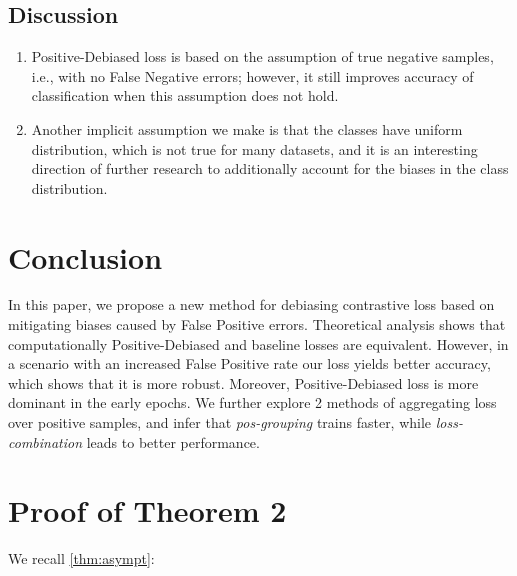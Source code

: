 \documentclass{article}
\begin{document}
\subsection{Discussion}
\begin{enumerate}
    \item Positive-Debiased loss is based on the assumption of true negative samples, i.e., with no False Negative errors; however, it still improves accuracy of classification when this assumption does not hold.
    \item Another implicit assumption we make is that the classes have uniform distribution, which is not true for many datasets, and it is an interesting direction of further research to additionally account for the biases in the class distribution.
\end{enumerate}

\section{Conclusion}
In this paper, we propose a new method for debiasing contrastive loss based on mitigating biases caused by False Positive errors. Theoretical analysis shows that computationally Positive-Debiased and baseline losses are equivalent. However, in a scenario with an increased False Positive rate our loss yields better accuracy, which shows that it is more robust. Moreover, Positive-Debiased loss is more dominant in the early epochs. We further explore 2 methods of aggregating loss over positive samples, and infer that \textit{pos-grouping} trains faster, while \textit{loss-combination} leads to better performance. 




\clearpage



\appendix
\newpage
\section{Proof of Theorem 2}
We recall \cref{thm:asympt}:

\asympt*
\end{document}
